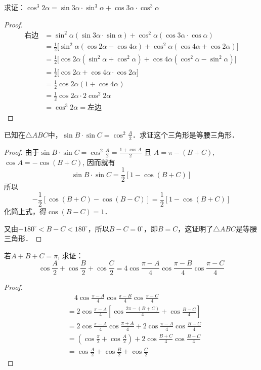 \begin{example}
求证：$\cos^3 2\alpha= \sin 3\alpha\cdot \sin^3\alpha+\cos 3\alpha\cdot \cos^3\alpha$
\end{example}

\begin{proof}
\[\begin{split}
\text{右边}&=\sin^2\alpha(\sin3\alpha\cdot \sin\alpha)+\cos^2\alpha(\cos3\alpha\cdot\cos\alpha)\\
&=\frac{1}{2}\big[\sin^2\alpha(\cos2\alpha-\cos4\alpha)+\cos^2\alpha(\cos4\alpha+\cos2\alpha)\big]\\
&=\frac{1}{2}\big[\cos 2\alpha(\sin^2\alpha+\cos^2\alpha)+\cos4\alpha(\cos^2\alpha-\sin^2\alpha)\big]\\
&=\frac{1}{2}\big[\cos2\alpha+\cos4\alpha\cdot\cos2\alpha\big]\\
&=\frac{1}{2}\cos2\alpha(1+\cos4\alpha)\\
&=\frac{1}{2}\cos2\alpha\cdot 2\cos^2 2\alpha\\
&=\cos^3 2\alpha=\text{左边}
\end{split}\]
\end{proof}

    

\begin{example}
    已知在$\triangle ABC$中，$\sin B\cdot \sin C=\cos^2\frac{A}{2}$．求证这个三角形是等腰三角形．
\end{example}


\begin{proof}
由于$\sin B\cdot \sin C=\cos^2\frac{A}{2}=\frac{1+\cos A}{2}$
且 $A=\pi-(B+C)$, $\cos A=-\cos(B+C)$, 因而就有
\[\sin B\cdot \sin C =\frac{1}{2} [1-\cos (B+C) ] \]
所以
\[-\frac{1}{2}[\cos (B+C) -\cos (B-C) ]
=\frac{1}{2}[1-\cos (B+C)]\]
化简上式，得$\cos (B-C) =1$．

又由$-180^{\circ}<B-C<180^{\circ}$，所以$B-C=0^{\circ}$，即$B=C$，这证明了$\triangle ABC$是等腰三角形．    
\end{proof}


\begin{example}
若$A+B+C=\pi$, 求证：
$$\cos\frac{A}{2}+\cos \frac{B}{2}+\cos \frac{C}{2}=4\cos\frac{\pi-A}{4}\cos\frac{\pi-B}{4}\cos\frac{\pi-C}{4}$$  
\end{example}

\begin{proof}
\[\begin{split}
&\quad  4\cos\frac{\pi-A}{4}\cos\frac{\pi-B}{4}\cos\frac{\pi-C}{4}\\
&= 2\cos\frac{\pi-A}{4}\left[\cos\frac{2\pi-(B+C)}{4}+\cos\frac{B-C}{4}\right]\\
&= 2\cos\frac{\pi-A}{4}  \cos\frac{\pi+A}{4} +2\cos\frac{\pi-A}{4} \cos\frac{B-C}{4} \\
&=\left(\cos\frac{\pi}{2}+\cos\frac{A}{2}\right)+2\cos\frac{B+C}{4}\cos\frac{B-C}{4}   \\
&=\cos\frac{A}{2}+\cos \frac{B}{2}+\cos \frac{C}{2}
\end{split}\] 
\end{proof}

